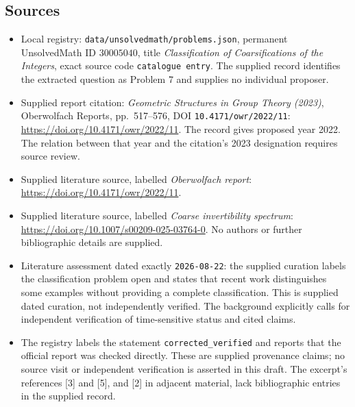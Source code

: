 \documentclass[11pt]{article}
\begin{document}
\subsection{Sources}
\begin{itemize}
\item Local registry: \texttt{data/unsolvedmath/problems.json}, permanent UnsolvedMath ID \(30005040\), title \emph{Classification of Coarsifications of the Integers}, exact source code \texttt{catalogue entry}. The supplied record identifies the extracted question as Problem 7 and supplies no individual proposer.
\item Supplied report citation: \emph{Geometric Structures in Group Theory (2023)}, Oberwolfach Reports, pp.~517--576, DOI \texttt{10.4171/owr/2022/11}: \url{https://doi.org/10.4171/owr/2022/11}. The record gives proposed year 2022. The relation between that year and the citation's 2023 designation requires source review.
\item Supplied literature source, labelled \emph{Oberwolfach report}: \url{https://doi.org/10.4171/owr/2022/11}.
\item Supplied literature source, labelled \emph{Coarse invertibility spectrum}: \url{https://doi.org/10.1007/s00209-025-03764-0}. No authors or further bibliographic details are supplied.
\item Literature assessment dated exactly \texttt{2026-08-22}: the supplied curation labels the classification problem open and states that recent work distinguishes some examples without providing a complete classification. This is supplied dated curation, not independently verified. The background explicitly calls for independent verification of time-sensitive status and cited claims.
\item The registry labels the statement \texttt{corrected\_verified} and reports that the official report was checked directly. These are supplied provenance claims; no source visit or independent verification is asserted in this draft. The excerpt's references [3] and [5], and [2] in adjacent material, lack bibliographic entries in the supplied record.
\end{itemize}
\end{document}
